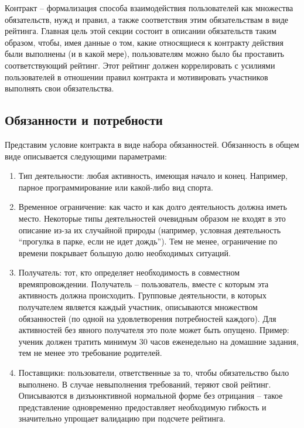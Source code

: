 \documentclass[specification,annotation]{itmo-student-thesis}
\begin{document}
Контракт -- формализация способа взаимодействия пользователей как
множества обязательств, нужд и правил, а также соответствия этим
обязательствам в виде рейтинга. Главная цель этой секции состоит в
описании обязательств таким образом, чтобы, имея данные о том, какие
относящиеся к контракту действия были выполнены (и в какой мере),
пользователям можно было бы проставить соответствующий рейтинг. Этот
рейтинг должен коррелировать с усилиями пользователей в отношении
правил контракта и мотивировать участников выполнять свои
обязательства.

\subsection{Обязанности и потребности}

Представим условие контракта в виде набора обязанностей. Обязанность в
общем виде описывается следующими параметрами:

\begin{enumerate}
\item Тип деятельности: любая активность, имеющая начало и
  конец. Например, парное программирование или какой-либо вид спорта.
\item Временное ограничение: как часто и как долго деятельность должна
  иметь место. Некоторые типы деятельностей очевидным образом не
  входят в это описание из-за их случайной природы (например, условная
  деятельность ``прогулка в парке, если не идет дождь''). Тем не
  менее, ограничение по времени покрывает большую долю необходимых
  ситуаций.
\item Получатель: тот, кто определяет необходимость в совместном
  времяпровождении. Получатель -- пользователь, вместе с которым эта
  активность должна происходить. Групповые деятельности, в которых
  получателем является каждый участник, описываются множеством
  обязанностей (по одной на удовлетворения потребностей каждого). Для
  активностей без явного получателя это поле может быть
  опущено. Пример: ученик должен тратить минимум 30 часов еженедельно
  на домашние задания, тем не менее это требование родителей.
\item Поставщики: пользователи, ответственные за то, чтобы
  обязательство было выполнено. В случае невыполнения требований,
  теряют свой рейтинг. Описываются в дизъюнктивной нормальной форме
  без отрицания -- такое представление одновременно предоставляет
  необходимую гибкость и значительно упрощает валидацию при подсчете
  рейтинга.
\end{enumerate}
\end{document}
